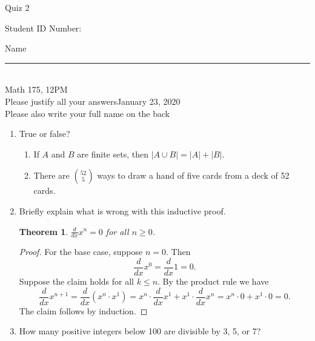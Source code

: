 \documentclass[12pt]{article}
\newtheorem*{theorem*}{Theorem}
\begin{document}
\begin{flushleft} 
\centerline{\LARGE{Quiz 2}} 
\vspace{5 mm}
{Student ID Number:}\hfill  
{Name \rule {2 in}{0.01in}}\\
Math 175, 12PM
\\
{Please justify all your answers}\hfill {January 23, 2020}
\\
{Please also write your full name on the back} 

\medskip
\end{flushleft}

\begin{enumerate}
	\item True or false?
	\begin{enumerate}
		\item If $A$ and $B$ are finite sets, then $|A\cup B| = |A| + |B|$.
		\item There are $\binom{52}{5}$ ways to draw a hand of five cards from a deck of 52 cards.
	\end{enumerate}
	\item Briefly explain what is wrong with this inductive proof.
	\begin{theorem*}
		$\frac{d}{dx}x^n = 0$ for all $n\geq 0$.
	\end{theorem*}
	\begin{proof}
		For the base case, suppose $n = 0$. Then
		\[
		\frac{d}{dx}x^0 = \frac{d}{dx}1 = 0.
		\]
		Suppose the claim holds for all $k\leq n$. By the product rule we have
		\[
		\frac{d}{dx}x^{n+1} = \frac{d}{dx}(x^n\cdot x^1) = x^n\cdot \frac{d}{dx}x^1 + x^1\cdot \frac{d}{dx}x^n = x^n\cdot 0 + x^1\cdot 0 = 0.
		\]
		The claim follows by induction.
	\end{proof}
	\vfill

	\item How many positive integers below 100 are divisible by 3, 5, or 7?
	\vfill
\end{enumerate}

\end{document}
